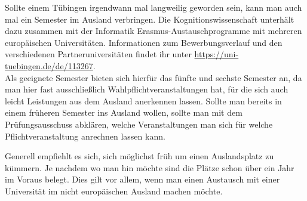 Sollte einem Tübingen irgendwann mal langweilig geworden sein, kann man auch
mal ein Semester im Ausland verbringen. Die Kognitionswissenschaft unterhält
dazu zusammen mit der Informatik Erasmus-Austauschprogramme mit mehreren
europäischen Universitäten. Informationen zum Bewerbungsverlauf und den
verschiedenen Partneruniversitäten findet ihr unter
\url{https://uni-tuebingen.de/de/113267}.\\	%

Als geeignete Semester bieten sich hierfür das fünfte und sechste Semester an,
da man hier fast ausschließlich Wahlpflichtveranstaltungen hat, für die sich
auch leicht Leistungen aus dem Ausland anerkennen lassen. Sollte man bereits in
einem früheren Semester ins Ausland wollen, sollte man mit dem
Prüfungsausschuss abklären, welche Veranstaltungen man sich für welche
Pflichtveranstaltung anrechnen lassen kann.

Generell empfiehlt es sich, sich möglichst früh um einen Auslandsplatz zu
kümmern. Je nachdem wo man hin möchte sind die Plätze schon über ein Jahr im
Voraus belegt. Dies gilt vor allem, wenn man einen Austausch mit einer
Universität im nicht europäischen Ausland machen möchte.

